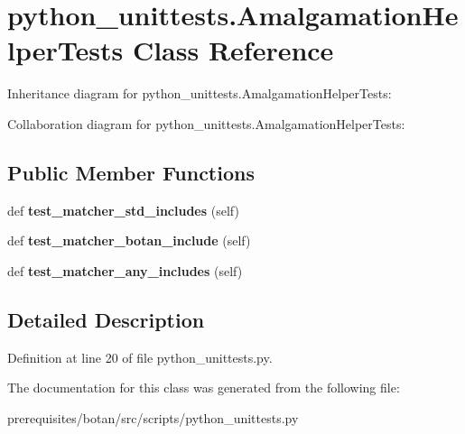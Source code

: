 \hypertarget{classpython__unittests_1_1_amalgamation_helper_tests}{}\section{python\+\_\+unittests.\+Amalgamation\+Helper\+Tests Class Reference}
\label{classpython__unittests_1_1_amalgamation_helper_tests}


Inheritance diagram for python\+\_\+unittests.\+Amalgamation\+Helper\+Tests\+:


Collaboration diagram for python\+\_\+unittests.\+Amalgamation\+Helper\+Tests\+:
\subsection*{Public Member Functions}
\begin{DoxyCompactItemize}
\item 
\mbox{\label{classpython__unittests_1_1_amalgamation_helper_tests_af0b2cbe9a10150a512f85a1afbdae9d1}} 
def {\bfseries test\+\_\+matcher\+\_\+std\+\_\+includes} (self)
\item 
\mbox{\label{classpython__unittests_1_1_amalgamation_helper_tests_a33c0bbd07fb0e0b128a21ae22338edd7}} 
def {\bfseries test\+\_\+matcher\+\_\+botan\+\_\+include} (self)
\item 
\mbox{\label{classpython__unittests_1_1_amalgamation_helper_tests_a303405562d53fffe5b98ef7bc5707ab1}} 
def {\bfseries test\+\_\+matcher\+\_\+any\+\_\+includes} (self)
\end{DoxyCompactItemize}


\subsection{Detailed Description}


Definition at line 20 of file python\+\_\+unittests.\+py.



The documentation for this class was generated from the following file\+:\begin{DoxyCompactItemize}
\item 
prerequisites/botan/src/scripts/python\+\_\+unittests.\+py\end{DoxyCompactItemize}
